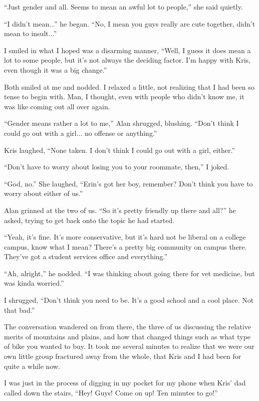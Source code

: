 ``Just gender and all.  Seems to mean an awful lot to people,'' she said quietly.

``I didn't mean...'' he began.  ``No, I mean you guys really are cute together, didn't mean to insult...''

I smiled in what I hoped was a disarming manner, ``Well, I guess it does mean a lot to some people, but it's not always the deciding factor.  I'm happy with Kris, even though it was a big change.''

Both smiled at me and nodded.  I relaxed a little, not realizing that I had been so tense to begin with.  Man, I thought, even with people who didn't know me, it was like coming out all over again.

``Gender means rather a lot to me,'' Alan shrugged, blushing.  ``Don't think I could go out with a girl... no offense or anything.''

Kris laughed, ``None taken.  I don't think I could go out with a girl, either.''

``Don't have to worry about losing you to your roommate, then,'' I joked.

``God, no.''  She laughed, ``Erin's got her boy, remember?  Don't think you have to worry about either of us.''

Alan grinned at the two of us.  ``So it's pretty friendly up there and all?'' he asked, trying to get back onto the topic he had started.

``Yeah, it's fine.  It's more conservative, but it's hard not be liberal on a college campus, know what I mean?  There's a pretty big community on campus there.  They've got a student services office and everything.''

``Ah, alright,'' he nodded.  ``I was thinking about going there for vet medicine, but was kinda worried.''

I shrugged, ``Don't think you need to be.  It's a good school and a cool place.  Not that bad.''

The conversation wandered on from there, the three of us discussing the relative merits of mountains and plains, and how that changed things such as what type of bike you wanted to buy.  It took me several minutes to realize that we were our own little group fractured away from the whole, that Kris and I had been for quite a while now.

I was just in the process of digging in my pocket for my phone when Kris' dad called down the stairs, ``Hey!  Guys!  Come on up!  Ten minutes to go!''

